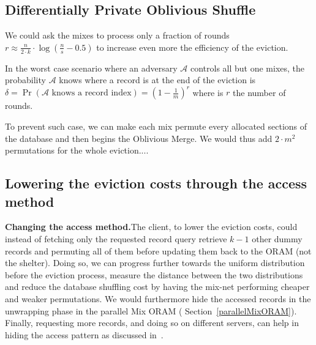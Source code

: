 \documentclass{llncs}
\begin{document}
\subsection{Differentially Private Oblivious Shuffle}\label{DPOS}
We could ask the mixes to process only a fraction of rounds $r \approx \frac{n}{2\cdot k }  \cdot \log \left (\frac{n}{s}-0.5 \right)$ to increase even more the efficiency of the eviction.

In the worst case scenario where an adversary $\mathcal{A}$ controls all but one mixes, the probability  $\mathcal{A}$ knows where a record is at the end of the eviction is $\delta= \Pr \left ( \mathcal{A} \text{ knows a record index}\right ) = \left ( 1 - \frac{1}{m} \right )^r$ where is $r$ the number of rounds.

To prevent such case, we can make each mix permute every allocated sections of the database and then begins the Oblivious Merge. We would thus add $2 \cdot m^2$ permutations for the whole eviction....

\subsection{Lowering the eviction costs through the access method}\label{AccessMethod}

\noindent\textbf{Changing the access method.}The client, to lower the eviction costs, could instead of fetching only the requested record query retrieve $k-1$ other dummy records and permuting all of them before updating them back to the ORAM (not the shelter).
Doing so, we can progress further towards the uniform distribution before the eviction process, measure the distance between the two distributions and reduce the database shuffling cost by having the mix-net performing cheaper and weaker permutations. We would furthermore hide the accessed records in the unwrapping phase in the parallel Mix ORAM ( Section~\ref{parallelMixORAM}). Finally, requesting more records, and doing so on different servers, can help in hiding the access pattern as discussed in~\cite{toledo2016lower}.\\
\end{document}
